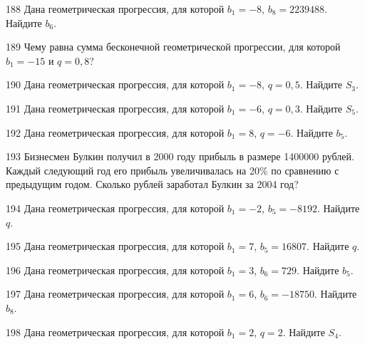 \documentclass[4apaper]{article}
\begin{document}
\begin{taskBN}{188}
Дана геометрическая прогрессия, для которой $b_1 = -8$, $b_{8}=2239488$. Найдите $b_{6}$.
\end{taskBN}

\begin{taskBN}{189}
Чему равна сумма бесконечной геометрической прогрессии, для которой $b_1 = -15$ и $q=0,8$?
\end{taskBN}

\begin{taskBN}{190}
Дана геометрическая прогрессия, для которой $b_1 = -8$, $q=0,5$. Найдите $S_{3}$.
\end{taskBN}

\begin{taskBN}{191}
Дана геометрическая прогрессия, для которой $b_1 = -6$, $q=0,3$. Найдите $S_{5}$.
\end{taskBN}

\begin{taskBN}{192}
Дана геометрическая прогрессия, для которой $b_1 = 8$, $q=-6$. Найдите $b_{5}$.
\end{taskBN}

\begin{taskBN}{193}
Бизнесмен Булкин получил в 2000 году прибыль в размере 1400000 рублей. Каждый следующий год его прибыль увеличивалась на 20\% по сравнению с предыдущим годом. Сколько рублей заработал Булкин за 2004 год?
\end{taskBN}

\begin{taskBN}{194}
Дана геометрическая прогрессия, для которой $b_1 = -2$, $b_{5}=-8192$. Найдите $q$.
\end{taskBN}

\begin{taskBN}{195}
Дана геометрическая прогрессия, для которой $b_1 = 7$, $b_{5}=16807$. Найдите $q$.
\end{taskBN}

\begin{taskBN}{196}
Дана геометрическая прогрессия, для которой $b_1 = 3$, $b_{6}=729$. Найдите $b_{5}$.
\end{taskBN}

\begin{taskBN}{197}
Дана геометрическая прогрессия, для которой $b_1 = 6$, $b_{6}=-18750$. Найдите $b_{8}$.
\end{taskBN}

\begin{taskBN}{198}
Дана геометрическая прогрессия, для которой $b_1 = 2$, $q=2$. Найдите $S_{4}$.
\end{taskBN}
\end{document}
